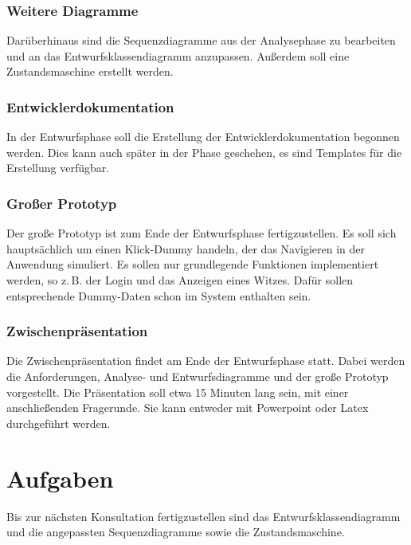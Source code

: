 \documentclass{scrartcl}
\begin{document}
\subsubsection{Weitere Diagramme}
Darüberhinaus sind die Sequenzdiagramme aus der Analysephase zu bearbeiten und an das Entwurfsklassendiagramm anzupassen. Außerdem soll eine Zustandsmaschine erstellt werden.
\subsubsection{Entwicklerdokumentation}
In der Entwurfsphase soll die Erstellung der Entwicklerdokumentation begonnen werden. Dies kann auch sp\"ater in der Phase geschehen, es sind Templates für die Erstellung verf\"ugbar.
\subsubsection{Gro\ss{}er Prototyp}
Der große Prototyp ist zum Ende der Entwurfsphase fertigzustellen. Es soll sich haupts\"achlich um einen Klick-Dummy handeln, der das Navigieren in der Anwendung simuliert. Es sollen nur grundlegende Funktionen implementiert werden, so z.\,B. der Login und das Anzeigen eines Witzes. Dafür sollen entsprechende Dummy-Daten schon im System enthalten sein.
\subsubsection{Zwischenpr\"asentation}
Die Zwischenpr\"asentation findet am Ende der Entwurfsphase statt. Dabei werden die Anforderungen, Analyse- und Entwurfsdiagramme und der große Prototyp vorgestellt. Die Pr\"asentation soll etwa 15 Minuten lang sein, mit einer anschließenden Fragerunde. Sie kann entweder mit Powerpoint oder Latex durchgeführt werden.
\vspace*{1em}

\section{Aufgaben}
Bis zur n\"achsten Konsultation fertigzustellen sind das Entwurfsklassendiagramm und die angepassten Sequenzdiagramme sowie die Zustandsmaschine.
\end{document}
